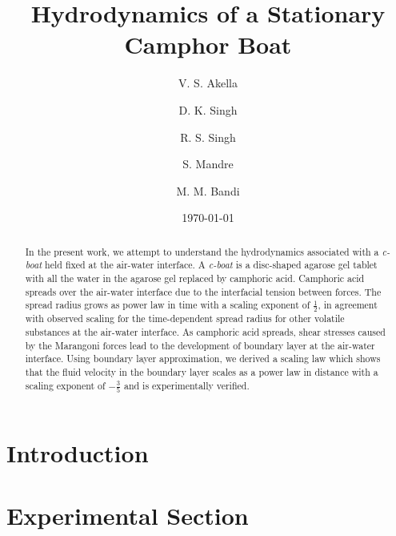 \documentclass[aps, twocolumn, floatfix, superscriptaddress]{revtex4}
\begin{document}
\title{Hydrodynamics of a Stationary Camphor Boat}

\author{V. S. Akella}
\author{D. K. Singh}
\author{R. S. Singh}
\author{S. Mandre}
\author{M. M. Bandi}

\date{\today}

\begin{abstract}
In the present work, we attempt to understand the hydrodynamics associated with a \emph{c-boat} held fixed at the air-water interface. A \emph{c-boat} is a disc-shaped agarose gel tablet with all the water in the agarose gel replaced by camphoric acid. Camphoric acid spreads over the air-water interface due to the interfacial tension between forces. The spread radius grows as power law in time with a scaling exponent of $\frac{1}{2}$, in agreement with observed scaling for the time-dependent spread radius for other volatile substances at the air-water interface. As camphoric acid spreads, shear stresses caused by the Marangoni forces lead to the development of boundary layer at the air-water interface. Using boundary layer approximation, we derived a scaling law which shows that the fluid velocity in the boundary layer scales as a power law in distance with a scaling exponent of $-\frac{3}{5}$ and is experimentally verified. 
\end{abstract}

\maketitle
\section{Introduction}
\section{Experimental Section}
\end{document}
